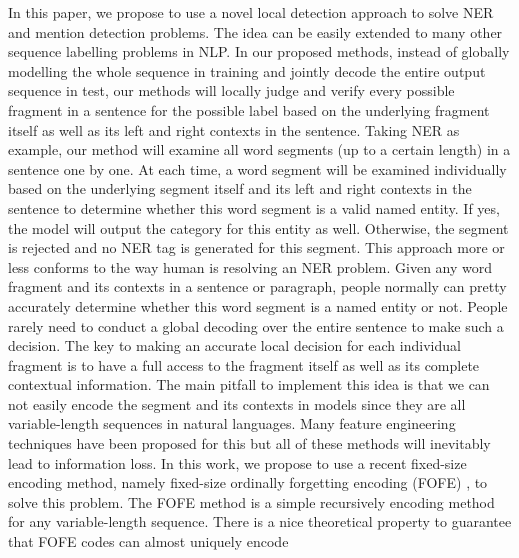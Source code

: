 \documentclass[11pt,a4paper]{article}
\begin{document}
In this paper, we propose to use a novel local detection approach to solve NER and mention detection problems.  The idea can be easily extended to many other sequence labelling problems in NLP.  In our proposed methods, instead of globally modelling the whole sequence in training and jointly decode the entire output sequence in test, 
our methods will locally judge and verify every possible fragment in a sentence for the possible label based on the underlying fragment itself as well as its left and right contexts in the sentence.  Taking NER as example, our method will examine all word segments (up to a certain length) in a sentence one by one. At each time, a word segment will be examined individually based on the underlying segment itself and its left and right contexts in the sentence to determine whether this word segment is a valid named entity. If yes, the model will output the category for this entity as well. Otherwise, the segment is rejected and no NER tag is generated for this segment.
This approach more or less conforms to the way human is resolving an NER problem. Given any word fragment and its contexts in a sentence or paragraph, people normally can pretty accurately determine whether this word segment is a named entity or not. People rarely need to conduct a global decoding over the entire sentence to make such a decision. 
The key to making an accurate local decision for each individual fragment is to have a full access to the fragment itself as well as its complete contextual information. 
The main pitfall to implement this idea is that we can not easily encode the segment and its contexts in models since they are all variable-length sequences in natural languages. Many feature engineering techniques have been proposed for this but all of these methods will inevitably lead to information loss. 
In this work, we propose to use a recent fixed-size encoding method, namely fixed-size ordinally forgetting encoding (FOFE) \cite{zhang2015fixed}, to solve this problem.  The FOFE method is a simple recursively encoding method for any variable-length sequence. There is a nice theoretical property to guarantee that FOFE codes can almost uniquely encode
\end{document}
